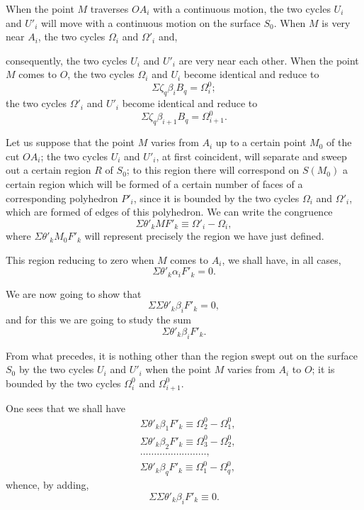 \documentclass{article}
\begin{document}
When the point $M$ traverses $OA_{i}$ with a continuous motion, the two cycles $U_{i}$ and $U'_{i}$ will move with a continuous motion on the surface $S_{0}$. When $M$ is very near $A_{i}$, the two cycles $\Omega_{i}$ and $\Omega'_{i}$ and,

consequently, the two cycles $U_{i}$ and $U'_{i}$ are very near each other. When the point $M$ comes to $O$, the two cycles $\Omega_{i}$ and $U_{i}$ become identical and reduce to
\[ \Sigma \zeta_{q} \beta_{i}B_{q} = \Omega^{0}_{i}; \]
the two cycles $\Omega'_{i}$ and $U'_{i}$ become identical and reduce to
\[ \Sigma \zeta_{q} \beta_{i+1}B_{q} = \Omega^{0}_{i+1}. \]

Let us suppose that the point $M$ varies from $A_{i}$ up to a certain point $M_{0}$ of the cut $OA_{i}$; the two cycles $U_{i}$ and $U'_{i}$, at first coincident, will separate and sweep out a certain region $R$ of $S_{0}$; to this region there will correspond on $S(M_{0})$ a certain region which will be formed of a certain number of faces of a corresponding polyhedron $P'_{i}$, since it is bounded by the two cycles $\Omega_{i}$ and $\Omega'_{i}$, which are formed of edges of this polyhedron. We can write the congruence
\[ \Sigma \theta'_{k} MF'_{k} \equiv \Omega'_{i} - \Omega_{i}, \tag{5} \]
where $\Sigma \theta'_{k} M_{0}F'_{k}$ will represent precisely the region we have just defined.

This region reducing to zero when $M$ comes to $A_{i}$, we shall have, in all cases,
\[ \Sigma \theta'_{k} \alpha_{i}F'_{k} = 0. \tag{8} \]

We are now going to show that
\[ \Sigma \Sigma \theta'_{k} \beta_{i}F'_{k} = 0, \]
and for this we are going to study the sum
\[ \Sigma \theta'_{k} \beta_{i}F'_{k}. \]

From what precedes, it is nothing other than the region swept out on the surface $S_{0}$ by the two cycles $U_{i}$ and $U'_{i}$ when the point $M$ varies from $A_{i}$ to $O$; it is bounded by the two cycles $\Omega^{0}_{i}$ and $\Omega^{0}_{i+1}$.


One sees that we shall have
\[ \begin{aligned} &\Sigma \theta'_{k} \beta_{1}F'_{k} \equiv \Omega^{0}_{2} - \Omega^{0}_{1},\\ &\Sigma \theta'_{k} \beta_{2}F'_{k} \equiv \Omega^{0}_{3} - \Omega^{0}_{2},\\ &\ldots\ldots\ldots\ldots\ldots\ldots\ldots\ldots,\\ &\Sigma \theta'_{k} \beta_{q}F'_{k} \equiv \Omega^{0}_{1} - \Omega^{0}_{q}, \end{aligned} \]
whence, by adding,
\[ \Sigma \Sigma \theta'_{k} \beta_{i}F'_{k} \equiv 0. \]
\end{document}
